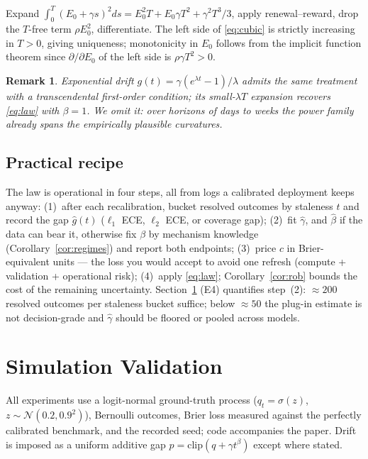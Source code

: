 \documentclass[conference]{IEEEtran}
\newtheorem{remark}{Remark}
\begin{document}
\begin{IEEEproof}
Expand $\int_0^T(E_0+\gamma s)^2ds = E_0^2T+E_0\gamma T^2+\gamma^2T^3/3$,
apply renewal--reward, drop the $T$-free term $\rho E_0^2$, differentiate.
The left side of \eqref{eq:cubic} is strictly increasing in $T>0$, giving
uniqueness; monotonicity in $E_0$ follows from the implicit function theorem
since $\partial/\partial E_0$ of the left side is $\rho\gamma T^{2}>0$.
\end{IEEEproof}

\begin{remark}
Exponential drift $g(t)=\gamma(e^{\lambda t}-1)/\lambda$ admits the same
treatment with a transcendental first-order condition; its small-$\lambda T$
expansion recovers \eqref{eq:law} with $\beta=1$. We omit it: over horizons
of days to weeks the power family already spans the empirically plausible
curvatures.
\end{remark}

\subsection{Practical recipe}
\label{sec:recipe}

The law is operational in four steps, all from logs a calibrated deployment
keeps anyway:
(1)~after each recalibration, bucket resolved outcomes by staleness $t$ and
record the gap $\hat g(t)$ ($\ell_1$ ECE, $\ell_2$ ECE, or coverage gap);
(2)~fit $\hat\gamma$, and $\hat\beta$ if the data can bear it, otherwise fix
$\beta$ by mechanism knowledge (Corollary~\ref{cor:regimes}) and report both
endpoints;
(3)~price $c$ in Brier-equivalent units --- the loss you would accept to
avoid one refresh (compute + validation + operational risk);
(4)~apply \eqref{eq:law}; Corollary~\ref{cor:rob} bounds the cost of the
remaining uncertainty. Section~\ref{sec:sim} (E4) quantifies step~(2):
$\approx200$ resolved outcomes per staleness bucket suffice; below
$\approx50$ the plug-in estimate is not decision-grade and $\hat\gamma$
should be floored or pooled across models.

\section{Simulation Validation}
\label{sec:sim}

All experiments use a logit-normal ground-truth process
($q_t=\sigma(z)$, $z\sim\mathcal N(0.2,0.9^2)$), Bernoulli outcomes, Brier
loss measured against the perfectly calibrated benchmark, and the recorded
seed; code accompanies the paper. Drift is imposed as a uniform additive gap
$p=\mathrm{clip}(q+\gamma t^{\beta})$ except where stated.
\end{document}
